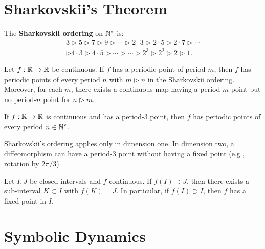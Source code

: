 \section{Sharkovskii's Theorem}

\begin{definition}
The \textbf{Sharkovskii ordering} on $\mathbb{N}^*$ is:
\begin{multline*}
    3 \triangleright 5 \triangleright 7 \triangleright 9 \triangleright \cdots
    \triangleright 2{\cdot}3 \triangleright 2{\cdot}5 \triangleright 2{\cdot}7
    \triangleright \cdots \\
    \triangleright 4{\cdot}3 \triangleright 4{\cdot}5 \triangleright \cdots
    \triangleright \cdots \triangleright 2^3 \triangleright 2^2
    \triangleright 2 \triangleright 1.
\end{multline*}
\end{definition}

\begin{theorem}[Sharkovskii, 1964]
Let $f : \mathbb{R} \to \mathbb{R}$ be continuous. If $f$ has a periodic point of period $m$,
then $f$ has periodic points of every period $n$ with $m \triangleright n$ in
the Sharkovskii ordering. Moreover, for each $m$, there exists a continuous
map having a period-$m$ point but no period-$n$ point for $n \triangleright m$.
\end{theorem}

\begin{corollary}
If $f : \mathbb{R} \to \mathbb{R}$ is continuous and has a period-3 point, then $f$ has
periodic points of every period $n \in \mathbb{N}^*$.
\end{corollary}

\begin{remark}
Sharkovskii's ordering applies only in dimension one. In dimension two, a
diffeomorphism can have a period-3 point without having a fixed point (e.g.,
rotation by $2\pi/3$).
\end{remark}

\begin{lemma}
\label{lem:covering}
Let $I, J$ be closed intervals and $f$ continuous. If $f(I) \supset J$, then
there exists a sub-interval $K \subset I$ with $f(K) = J$. In particular, if
$f(I) \supset I$, then $f$ has a fixed point in $I$.
\end{lemma}

\section{Symbolic Dynamics}

